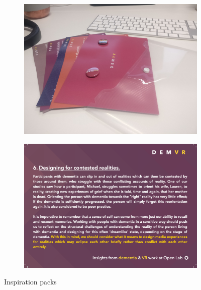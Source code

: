 \begin{figure}
\centering
\begin{subfigure}{.5\textwidth}
  \centering
  \includegraphics[width=.8\linewidth]{Images/DemVR/DemVRInspiration.jpeg}
  \label{fig:InspirationPackImage}
\end{subfigure}%
\begin{subfigure}{.5\textwidth}
  \centering
  \includegraphics[width=.8\linewidth]{Images/DemVR/InspirationCard.png}
  \label{fig:InspirationCard}
\end{subfigure}
\caption{Inspiration packs}
\label{fig:InspirationPacks}
\end{figure}

